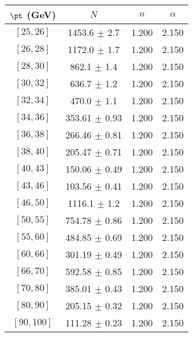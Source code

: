 \begin{tabular}{c||c|c|c}
$\pt$ (GeV) & $N$ & $n$ & $\alpha$ \\
\hline
$[25, 26]$ & 1453.6 $\pm$ 2.7 & 1.200 & 2.150\\
$[26, 28]$ & 1172.0 $\pm$ 1.7 & 1.200 & 2.150\\
$[28, 30]$ & 862.1 $\pm$ 1.4 & 1.200 & 2.150\\
$[30, 32]$ & 636.7 $\pm$ 1.2 & 1.200 & 2.150\\
$[32, 34]$ & 470.0 $\pm$ 1.1 & 1.200 & 2.150\\
$[34, 36]$ & 353.61 $\pm$ 0.93 & 1.200 & 2.150\\
$[36, 38]$ & 266.46 $\pm$ 0.81 & 1.200 & 2.150\\
$[38, 40]$ & 205.47 $\pm$ 0.71 & 1.200 & 2.150\\
$[40, 43]$ & 150.06 $\pm$ 0.49 & 1.200 & 2.150\\
$[43, 46]$ & 103.56 $\pm$ 0.41 & 1.200 & 2.150\\
$[46, 50]$ & 1116.1 $\pm$ 1.2 & 1.200 & 2.150\\
$[50, 55]$ & 754.78 $\pm$ 0.86 & 1.200 & 2.150\\
$[55, 60]$ & 484.85 $\pm$ 0.69 & 1.200 & 2.150\\
$[60, 66]$ & 301.19 $\pm$ 0.49 & 1.200 & 2.150\\
$[66, 70]$ & 592.58 $\pm$ 0.85 & 1.200 & 2.150\\
$[70, 80]$ & 385.01 $\pm$ 0.43 & 1.200 & 2.150\\
$[80, 90]$ & 205.15 $\pm$ 0.32 & 1.200 & 2.150\\
$[90, 100]$ & 111.28 $\pm$ 0.23 & 1.200 & 2.150\\
\end{tabular}
